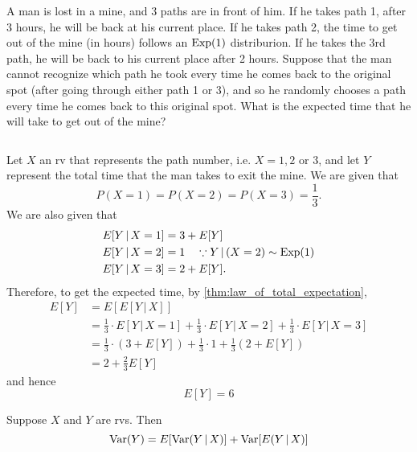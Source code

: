\documentclass[notoc,notitlepage]{tufte-book}
\begin{document}
\begin{eg}
A man is lost in a mine, and 3 paths are in front of him. If he takes path 1, after 3 hours, he will be back at his current place. If he takes path 2, the time to get out of the mine (in hours) follows an $\operatorname{Exp}(1)$ distriburion. If he takes the 3rd path, he will be back to his current place after 2 hours. Suppose that the man cannot recognize which path he took every time he comes back to the original spot (after going through either path 1 or 3), and so he randomly chooses a path every time he comes back to this original spot. What is the expected time that he will take to get out of the mine?
\end{eg}

$ $ \\

\begin{solution}
  Let $X$ an rv that represents the path number, i.e. $X = 1, 2$ or $3$, and let $Y$ represent the total time that the man takes to exit the mine. We are given that
  \begin{equation*}
    P(X = 1) = P(X = 2) = P(X = 3) = \frac{1}{3}.
  \end{equation*}
  We are also given that
  \begin{align*}
    E[ Y \, | \, X = 1 ] &= 3 + E[Y] \\
    E[ Y \, | \, X = 2 ] &= 1 \quad \because Y \, | \, (X = 2) \sim \operatorname{Exp}(1) \\
    E[ Y \, | \, X = 3 ] &= 2 + E[Y].
  \end{align*}
  Therefore, to get the expected time, by \cref{thm:law_of_total_expectation},
  \begin{align*}
    E[Y] &= E[ E[ Y \, | \, X ] ] \\
      &= \frac{1}{3} \cdot E[ Y \, | \, X = 1 ] + \frac{1}{3} \cdot E[ Y \, | \, X = 2 ] + \frac{1}{3} \cdot E[ Y \, | \, X = 3 ] \\
      &= \frac{1}{3} \cdot ( 3 + E[Y] ) + \frac{1}{3} \cdot 1 + \frac{1}{3} (2 + E[Y]) \\
      &= 2 + \frac{2}{3} E[Y]
  \end{align*}
  and hence
  \begin{equation*}
    E[Y] = 6
  \end{equation*}
\end{solution}

\begin{thm}
\label{thm:law_of_total_variance}
  Suppose $X$ and $Y$ are rvs. Then
  \begin{equation*}
    \operatorname{Var}(Y) = E[ \operatorname{Var}(Y \, | \, X) ] + \operatorname{Var}[ E(Y \, | \, X) ]
  \end{equation*}
\end{thm}
\end{document}
